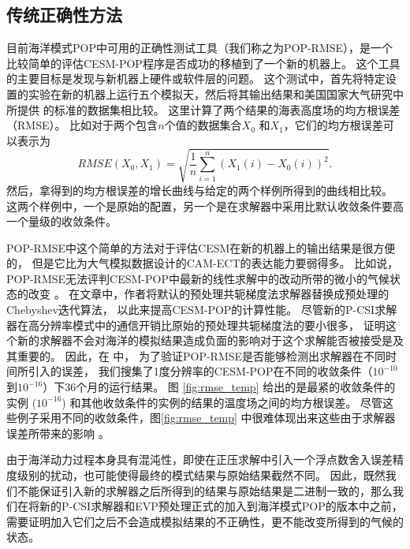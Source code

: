 \subsection{传统正确性方法}
\label{sec:verifyPart11}
目前海洋模式POP中可用的正确性测试工具（我们称之为POP-RMSE），是一个比较简单的评估CESM-POP程序是否成功的移植到了一个新的机器上。 
这个工具的主要目标是发现与新机器上硬件或软件层的问题。 
这个测试中，首先将特定设置的实验在新的机器上运行五个模拟天，然后将其输出结果和美国国家大气研究中所提供 的标准的数据集相比较。
这里计算了两个结果的海表高度场的均方根误差（RMSE）。 比如对于两个包含$n$个值的数据集合$X_0$ 和$X_1$，它们的均方根误差可以表示为
 \begin{equation*}
 RMSE(X_0, X_1) = \sqrt{\frac{1}{n}\sum_{i=1}^n(X_1(i)-X_0(i))^2}.
 \end{equation*}
然后，拿得到的均方根误差的增长曲线与给定的两个样例所得到的曲线相比较。 
这两个样例中，一个是原始的配置，另一个是在求解器中采用比默认收敛条件要高一个量级的收敛条件。 

POP-RMSE中这个简单的方法对于评估CESM在新的机器上的输出结果是很方便的， 但是它比为大气模拟数据设计的CAM-ECT的表达能力要弱得多。 
比如说，POP-RMSE无法评判CESM-POP中最新的线性求解中的改动所带的微小的气候状态的改变 \cite{yong2015}。 
在文章\cite{yong2015}中，作者将默认的预处理共轭梯度法求解器替换成预处理的Chebyshev迭代算法， 以此来提高CESM-POP的计算性能。
尽管新的P-CSI求解器在高分辨率模式中的通信开销比原始的预处理共轭梯度法的要小很多， 证明这个新的求解器不会对海洋的模拟结果造成负面的影响对于这个求解能否被接受是及其重要的。 
因此，在 \cite{yong2015}中， 为了验证POP-RMSE是否能够检测出求解器在不同时间所引入的误差， 我们搜集了1度分辨率的CESM-POP在不同的收敛条件（$10^{-10}$ 到$10^{-16}$）下36个月的运行结果。  图   \ref{fig:rmse_temp} 给出的是最紧的收敛条件的实例  ($10^{-16}$) 和其他收敛条件的实例的结果的温度场之间的均方根误差。 
尽管这些例子采用不同的收敛条件，图\ref{fig:rmse_temp} 中很难体现出来这些由于求解器误差所带来的影响  \citep{yong2015}。 

 
由于海洋动力过程本身具有混沌性，即使在正压求解中引入一个浮点数舍入误差精度级别的扰动，也可能使得最终的模式结果与原始结果截然不同。 
因此，既然我们不能保证引入新的求解器之后所得到的结果与原始结果是二进制一致的，那么我们在将新的P-CSI求解器和EVP预处理正式的加入到海洋模式POP的版本中之前，需要证明加入它们之后不会造成模拟结果的不正确性，更不能改变所得到的气候的状态。 


